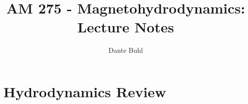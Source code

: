 \documentclass{article}
\begin{document}
\title{AM 275 - Magnetohydrodynamics: Lecture Notes}
\author{Dante Buhl}
\doublespacing


\newcommand{\wrms}{w_{\text{rms}}}
\newcommand{\bs}[1]{\boldsymbol{#1}}
\newcommand{\tb}[1]{\textbf{#1}}
\newcommand{\bmp}[1]{\begin{minipage}{#1\textwidth}}
\newcommand{\emp}{\end{minipage}}
\newcommand{\R}{\mathbb{R}}
\newcommand{\C}{\mathbb{C}}
\newcommand{\N}{\mathcal{N}}
\newcommand{\K}{\bs{\mathrm{K}}}
\newcommand{\m}{\bs{\mu}_*}
\newcommand{\s}{\bs{\Sigma}_*}
\newcommand{\dt}{\Delta t}
\newcommand{\dx}{\Delta x}
\newcommand{\tr}[1]{\text{Tr}(#1)}
\newcommand{\Tr}[1]{\text{Tr}(#1)}
\newcommand{\Div}{\nabla \cdot}
\renewcommand{\div}{\nabla \cdot}
\newcommand{\Curl}{\nabla \times}
\newcommand{\Grad}{\nabla}
\newcommand{\grad}{\nabla}
\newcommand{\grads}{\nabla_s}
\newcommand{\gradf}{\nabla_f}
\newcommand{\xs}{x_s}
\newcommand{\xf}{x_f}
\newcommand{\ts}{t_s}
\newcommand{\tf}{t_f}
\newcommand{\pt}{\partial t}
\newcommand{\pz}{\partial z}
\newcommand{\uvec}{\bs{u}}
\newcommand{\jvec}{\bs{j}}
\newcommand{\bvec}{\bs{B}}
\newcommand{\B}{\bs{B}}
\newcommand{\evec}{\bs{E}}
\newcommand{\E}{\bs{E}}
\newcommand{\vort}{\bs{\omega}}
\newcommand{\F}{\bs{F}}
\newcommand{\T}{\tilde{T}}
\newcommand{\ez}{\bs{e}_z}
\newcommand{\ex}{\bs{e}_x}
\newcommand{\ey}{\bs{e}_y}
\newcommand{\eo}{\bs{e}_{\bs{\Omega}}}
\newcommand{\ppt}[1]{\frac{\partial #1}{\partial t}}
\newcommand{\ddt}[1]{\frac{d #1}{d t}}
\newcommand{\DDt}[1]{\frac{D #1}{D t}}
\newcommand{\ppts}[1]{\frac{\partial #1}{\partial t_s}}
\newcommand{\pptf}[1]{\frac{\partial #1}{\partial t_f}}
\newcommand{\ppz}[1]{\frac{\partial #1}{\partial z}}
\newcommand{\ddz}[1]{\frac{d #1}{d z}}
\newcommand{\ppzetas}[1]{\frac{\partial^2 #1}{\partial \zeta^2}}
\newcommand{\ppzs}[1]{\frac{\partial #1}{\partial z_s}}
\newcommand{\ppzf}[1]{\frac{\partial #1}{\partial z_f}}
\newcommand{\ppx}[1]{\frac{\partial #1}{\partial x}}
\newcommand{\ppxi}[1]{\frac{\partial #1}{\partial x_i}}
\newcommand{\ppxj}[1]{\frac{\partial #1}{\partial x_j}}
\newcommand{\ppy}[1]{\frac{\partial #1}{\partial y}}
\newcommand{\ppzeta}[1]{\frac{\partial #1}{\partial \zeta}}


\maketitle 

\setlength{\parindent}{0pt}
\setcounter{section}{1}

\section{Hydrodynamics Review}
\end{document}
